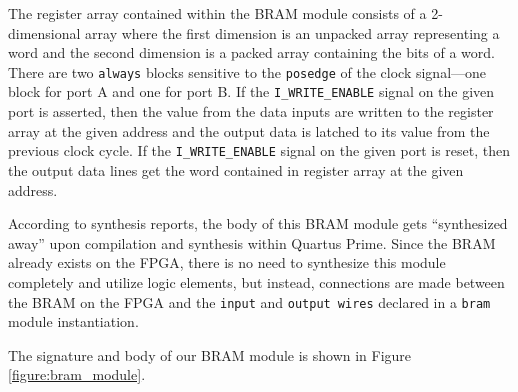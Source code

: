 \documentclass[conference]{IEEEtran}
\begin{document}
The register array contained within the BRAM module consists of a 2-dimensional array where the first dimension is an unpacked array representing a word and the second dimension is a packed array containing the bits of a word. There are two \verb|always| blocks sensitive to the \verb|posedge| of the clock signal---one block for port A and one for port B. If the \verb|I_WRITE_ENABLE| signal on the given port is asserted, then the value from the data inputs are written to the register array at the given address and the output data is latched to its value from the previous clock cycle. If the \verb|I_WRITE_ENABLE| signal on the given port is reset, then the output data lines get the word contained in register array at the given address.

According to synthesis reports, the body of this BRAM module gets ``synthesized away'' upon compilation and synthesis within Quartus Prime. Since the BRAM already exists on the FPGA, there is no need to synthesize this module completely and utilize logic elements, but instead, connections are made between the BRAM on the FPGA and the \verb|input| and \verb|output wires| declared in a \verb|bram| module instantiation.

The signature and body of our BRAM module is shown in Figure \ref{figure:bram_module}.
\end{document}
